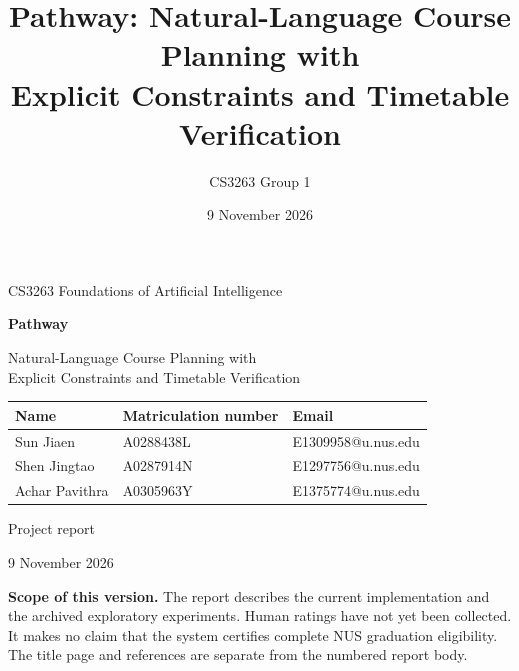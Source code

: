 \documentclass[11pt,a4paper]{article}
\title{Pathway: Natural-Language Course Planning with\protect\\Explicit Constraints and Timetable Verification}
\author{CS3263 Group 1}
\date{9 November 2026}
\begin{document}
\hypersetup{pageanchor=false}
\begin{titlepage}
\centering
\vspace*{1.5cm}
{\Large CS3263 Foundations of Artificial Intelligence\par}
\vspace{1.2cm}
{\huge\bfseries Pathway\par}
\vspace{0.4cm}
{\Large Natural-Language Course Planning with\\Explicit Constraints and Timetable Verification\par}
\vspace{1.8cm}
\begin{tabular}{lll}
\toprule
Name & Matriculation number & Email\\
\midrule
Sun Jiaen & A0288438L & E1309958@u.nus.edu\\
Shen Jingtao & A0287914N & E1297756@u.nus.edu\\
Achar Pavithra & A0305963Y & E1375774@u.nus.edu\\
\bottomrule
\end{tabular}
\vfill
{\large Project report\par}
9 November 2026
\vspace{1cm}
\begin{minipage}{0.9\textwidth}
\textbf{Scope of this version.} The report describes the current implementation and the archived exploratory experiments. Human ratings have not yet been collected. It makes no claim that the system certifies complete NUS graduation eligibility. The title page and references are separate from the numbered report body.
\end{minipage}
\end{titlepage}
\hypersetup{pageanchor=true}
\setcounter{page}{1}


\end{document}
